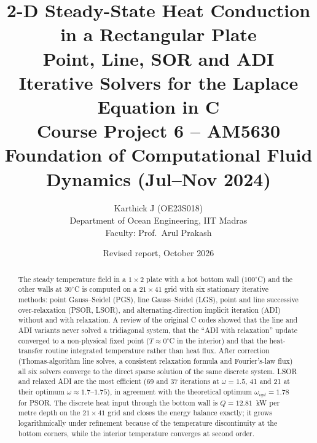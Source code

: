 
\title{\textbf{2-D Steady-State Heat Conduction in a Rectangular Plate}\\[2pt]\large Point, Line, SOR and ADI Iterative Solvers for the Laplace Equation in C\\[2pt]\normalsize Course Project 6 -- AM5630 Foundation of Computational Fluid Dynamics (Jul--Nov 2024)}
\author{Karthick J (OE23S018)\\Department of Ocean Engineering, IIT Madras\\Faculty: Prof.\ Arul Prakash}
\date{Revised report, October 2026}
\maketitle
\begin{abstract}
The steady temperature field in a $1\times2$ plate with a hot bottom wall ($100^\circ$C) and the other walls at $30^\circ$C is computed on a $21\times41$ grid with six stationary iterative methods: point Gauss--Seidel (PGS), line Gauss--Seidel (LGS), point and line successive over-relaxation (PSOR, LSOR), and alternating-direction implicit iteration (ADI) without and with relaxation. A review of the original C codes showed that the line and ADI variants never solved a tridiagonal system, that the ``ADI with relaxation'' update converged to a non-physical fixed point ($T\approx0^\circ$C in the interior) and that the heat-transfer routine integrated temperature rather than heat flux. After correction (Thomas-algorithm line solves, a consistent relaxation formula and Fourier's-law flux) all six solvers converge to the direct sparse solution of the same discrete system. LSOR and relaxed ADI are the most efficient (69 and 37 iterations at $\omega=1.5$, 41 and 21 at their optimum $\omega\approx1.7$--$1.75$), in agreement with the theoretical optimum $\omega_{opt}=1.78$ for PSOR. The discrete heat input through the bottom wall is $Q=12.81$~kW per metre depth on the $21\times41$ grid and closes the energy balance exactly; it grows logarithmically under refinement because of the temperature discontinuity at the bottom corners, while the interior temperature converges at second order.
\end{abstract}
\tableofcontents\newpage

